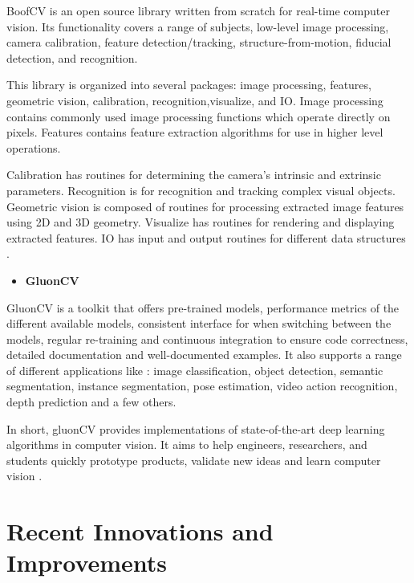    BoofCV is an open source library written from scratch for real-time computer vision. Its functionality covers a range of subjects, low-level image processing, camera calibration, feature detection/tracking, structure-from-motion, fiducial detection, and recognition. \par
	This library is organized into several packages: image processing, features, geometric vision, calibration, recognition,visualize, and IO. Image processing contains commonly used image processing functions which operate directly on pixels. Features contains feature extraction algorithms for use in higher level operations. \par Calibration has routines for determining the camera's intrinsic and extrinsic parameters. Recognition is for recognition and tracking complex visual objects. Geometric vision is composed of routines for processing extracted image features using 2D and 3D geometry. Visualize has routines for rendering and displaying extracted features. IO has input and output routines for different data structures \cite{boofcvweb}.

    \begin{itemize}
        \item \textbf{GluonCV}
    \end{itemize}

    GluonCV is a toolkit that offers pre-trained models, performance metrics of the different available models, consistent interface for when switching between the models, regular re-training and continuous integration to ensure code correctness, detailed documentation and well-documented examples. It also supports a range of different applications like : image classification, object detection, semantic segmentation, instance segmentation, pose estimation, video action recognition, depth prediction and a few others.

   In short, gluonCV provides implementations of state-of-the-art deep learning algorithms in computer vision. It aims to help engineers, researchers, and students quickly prototype products, validate new ideas and learn computer vision \cite{Guo2019}.

    

\newpage   


\section{Recent Innovations and Improvements}
\label{sec:state}

